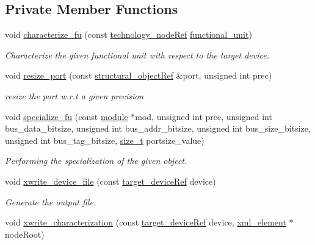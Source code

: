 \subsection*{Private Member Functions}
\begin{DoxyCompactItemize}
\item 
void \hyperlink{classRTLCharacterization_a2c6d6535a7801fbb3d01b3cbace87874}{characterize\+\_\+fu} (const \hyperlink{technology__node_8hpp_a33dd193b7bd6b987bf0d8a770a819fa7}{technology\+\_\+node\+Ref} \hyperlink{structfunctional__unit}{functional\+\_\+unit})
\begin{DoxyCompactList}\small\item\em Characterize the given functional unit with respect to the target device. \end{DoxyCompactList}\item 
void \hyperlink{classRTLCharacterization_a4f479d21fdda0208fad8b538edccad9c}{resize\+\_\+port} (const \hyperlink{structural__objects_8hpp_a8ea5f8cc50ab8f4c31e2751074ff60b2}{structural\+\_\+object\+Ref} \&port, unsigned int prec)
\begin{DoxyCompactList}\small\item\em resize the port w.\+r.\+t a given precision \end{DoxyCompactList}\item 
void \hyperlink{classRTLCharacterization_a39ae864464f1d90f555f8c6d682e65b2}{specialize\+\_\+fu} (const \hyperlink{classmodule}{module} $\ast$mod, unsigned int prec, unsigned int bus\+\_\+data\+\_\+bitsize, unsigned int bus\+\_\+addr\+\_\+bitsize, unsigned int bus\+\_\+size\+\_\+bitsize, unsigned int bus\+\_\+tag\+\_\+bitsize, \hyperlink{tutorial__fpt__2017_2intro_2sixth_2test_8c_a7c94ea6f8948649f8d181ae55911eeaf}{size\+\_\+t} portsize\+\_\+value)
\begin{DoxyCompactList}\small\item\em Performing the specialization of the given object. \end{DoxyCompactList}\item 
void \hyperlink{classRTLCharacterization_a2478484e956bec25a282ede5faaeaa88}{xwrite\+\_\+device\+\_\+file} (const \hyperlink{target__device_8hpp_acedb2b7a617e27e6354a8049fee44eda}{target\+\_\+device\+Ref} device)
\begin{DoxyCompactList}\small\item\em Generate the output file. \end{DoxyCompactList}\item 
void \hyperlink{classRTLCharacterization_a45858c1c48c467edd0a7eb04d27a478b}{xwrite\+\_\+characterization} (const \hyperlink{target__device_8hpp_acedb2b7a617e27e6354a8049fee44eda}{target\+\_\+device\+Ref} device, \hyperlink{classxml__element}{xml\+\_\+element} $\ast$node\+Root)

\end{DoxyCompactItemize}
